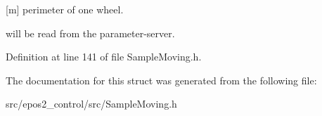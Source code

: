 \mbox{[}m\mbox{]} perimeter of one wheel. 

will be read from the parameter-\/server. 

Definition at line 141 of file Sample\-Moving.\-h.



The documentation for this struct was generated from the following file\-:\begin{DoxyCompactItemize}
\item 
src/epos2\-\_\-control/src/Sample\-Moving.\-h\end{DoxyCompactItemize}
